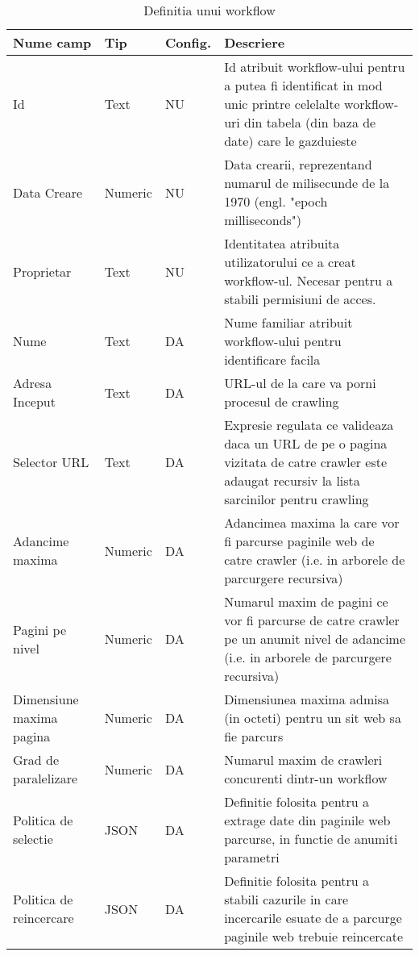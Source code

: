\begin{table}[h]
	\centering
    \begin{tabular}{|M{2.5cm}|M{1.6cm}|M{1.25cm}|M{7.25cm}|}
    	\hline 
    	Nume camp & Tip & Config. & Descriere \\ \hline
    	
    Id & Text & NU & Id atribuit workflow-ului pentru a putea fi identificat in mod unic printre celelalte workflow-uri din tabela (din baza de date) care le gazduieste \\ \hline
    
    Data Creare & Numeric & NU & Data crearii, reprezentand numarul de milisecunde de la 1970 (engl. "epoch milliseconds") \\ \hline
    
    Proprietar & Text & NU & Identitatea atribuita utilizatorului ce a creat workflow-ul. Necesar pentru a stabili permisiuni de acces. \\ \hline
    
    Nume & Text & DA & Nume familiar atribuit workflow-ului pentru identificare facila \\ \hline
    
    Adresa Inceput & Text & DA & URL-ul de la care va porni procesul de crawling \\ \hline
    
    Selector URL & Text & DA & Expresie regulata ce valideaza daca un URL de pe o pagina vizitata de catre crawler este adaugat recursiv la lista sarcinilor pentru crawling \\ \hline
    
    Adancime maxima & Numeric & DA & Adancimea maxima la care vor fi parcurse paginile web de catre crawler (i.e. in arborele de parcurgere recursiva) \\ \hline
    
    Pagini pe nivel & Numeric & DA & Numarul maxim de pagini ce vor fi parcurse de catre crawler pe un anumit nivel de adancime (i.e. in arborele de parcurgere recursiva) \\ \hline
    
    Dimensiune maxima pagina & Numeric & DA & Dimensiunea maxima admisa (in octeti) pentru un sit web sa fie parcurs \\ \hline
    
    Grad de paralelizare & Numeric & DA & Numarul maxim de crawleri concurenti dintr-un workflow \\ \hline
    
    Politica de selectie & JSON & DA & Definitie folosita pentru a extrage date din paginile web parcurse, in functie de anumiti parametri \\ \hline
    
    Politica de reincercare & JSON & DA & Definitie folosita pentru a stabili cazurile in care incercarile esuate de a parcurge paginile web trebuie reincercate \\ \hline
    
    \end{tabular}
    \caption{Definitia unui workflow}
\end{table}
\clearpage